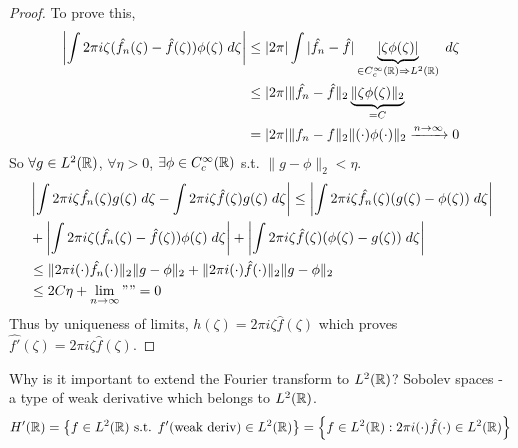 \begin{proof}
    To prove this,
    \begin{align*}
        \left| \int 2 \pi i \zeta (\hat{f_n}(\zeta) - \hat{f}(\zeta)) \phi(\zeta) \; d\zeta \right| &\leq |2 \pi | \int |\hat{f_n} - \hat{f}| \underbrace{|\zeta \phi(\zeta)|}_{\in C_c^\infty(\mathbb{R}) \Rightarrow L^2(\mathbb{R})} \; d \zeta  \\
        &\leq |2 \pi | \| \hat{f_n} - \hat{f} \|_2 \underbrace{\| \zeta \phi(\zeta) \|_2}_{= C}  \\
        &= |2 \pi | \| f_n - f \|_2 \| (\cdot) \phi(\cdot) \|_2 \xrightarrow{n \to \infty} 0  
    \end{align*}
    So $\forall g \in L^2(\mathbb{R})$, $\forall \eta > 0$, $\exists \phi \in C_c^\infty(\mathbb{R})$ s.t. $\| g - \phi \|_2 < \eta $.
    \begin{align*}
        &\left| \int 2 \pi i \zeta \hat{f_n}(\zeta) g(\zeta) \; d\zeta - \int 2 \pi i \zeta \hat{f}(\zeta) g(\zeta) \; d\zeta \right| 
        \leq \left| \int 2 \pi i \zeta \hat{f_n}(\zeta)(g(\zeta) - \phi(\zeta))  \; d \zeta \right| \\  &+ \left| \int 2 \pi i \zeta (\hat{f_n}(\zeta) - \hat{f}(\zeta)) \phi(\zeta) \; d\zeta \right| + \left| \int 2 \pi i \zeta \hat{f}(\zeta) (\phi(\zeta) - g(\zeta)) \; d\zeta \right| \\
         &\leq \| 2 \pi i (\cdot) \hat{f_n}(\cdot) \|_2 \| g - \phi \|_2 + \| 2 \pi i (\cdot) \hat{f}(\cdot) \|_2 \| g - \phi \|_2 \\
         &\leq 2 C \eta + \lim_{n \to \infty} "" = 0   
    \end{align*}    
    Thus by uniqueness of limits, $h(\zeta) = 2 \pi i \zeta \hat{f}(\zeta)$ which proves $\widehat{f'}(\zeta) = 2 \pi i \zeta \hat{f}(\zeta)$. \qedhere  
\end{proof}

\begin{rem}
    Why is it important to extend the Fourier transform to $L^2(\mathbb{R})$? 
    Sobolev spaces - a type of weak derivative which belongs to $L^2(\mathbb{R})$.
    \[
        H'(\mathbb{R}) = \left\{ f \in L^2(\mathbb{R}) \text{ s.t. } f' \text{(weak deriv)} \in L^2(\mathbb{R}) \right\} 
        = \left\{ f \in L^2(\mathbb{R}) : 2 \pi i (\cdot) \hat{f}(\cdot) \in L^2(\mathbb{R}) \right\} 
    \]   
\end{rem}

